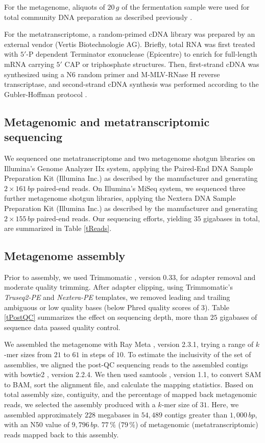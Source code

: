\documentclass{bmcart}
\begin{document}
For the metagenome, aliquots of $20\,g$ of the fermentation sample were used for total community DNA preparation as described previously \cite{Schlueter2008}.

For the metatranscriptome, a random-primed cDNA library was prepared by an external vendor (Vertis Biotechnologie AG). Briefly, total RNA was first treated with $5'$-P dependent Terminator exonuclease (Epicentre) to enrich for full-length mRNA carrying $5'$ CAP or triphosphate structures. Then, first-strand cDNA was synthesized using a N6 random primer and M-MLV-RNase H reverse transcriptase, and second-strand cDNA synthesis was performed according to the Gubler-Hoffman protocol \cite{GublerHoffman}.

\subsection*{Metagenomic and metatranscriptomic sequencing}
We sequenced one metatranscriptome and two metagenome shotgun libraries on Illumina's Genome Analyzer IIx system, applying the Paired-End DNA Sample Preparation Kit (Illumina Inc.) as described by the manufacturer and generating $2 \times 161\,bp$ paired-end reads.
On Illumina's MiSeq system, we sequenced three further metagenome shotgun libraries, applying the Nextera DNA Sample Preparation Kit (Illumina Inc.) as described by the manufacturer and generating $2 \times 155\,bp$ paired-end reads.
Our sequencing efforts, yielding $35$ gigabases in total, are summarized in Table \ref{tReads}.

\subsection*{Metagenome assembly}
Prior to assembly, we used Trimmomatic \cite{Trimmomatic}, version 0.33, for adapter removal and moderate quality trimming.
After adapter clipping, using Trimmomatic's \emph{Truseq2-PE} and \emph{Nextera-PE} templates, we removed leading and trailing ambiguous or low quality bases (below Phred quality scores of 3).
Table \ref{tPostQC} summarizes the effect on sequencing depth, more than $25$ gigabases of sequence data passed quality control.

We assembled the metagenome with Ray Meta \cite{RayMeta}, version 2.3.1, trying a range of $k$-mer sizes from $21$ to $61$ in steps of $10$.
To estimate the inclusivity of the set of assemblies, we aligned the post-QC sequencing reads to the assembled contigs with bowtie2 \cite{Bowtie2}, version 2.2.4.
We then used samtools \cite{Samtools}, version 1.1, to convert SAM to BAM, sort the alignment file, and calculate the mapping statistics.
Based on total assembly size, contiguity, and the percentage of mapped back metagenomic reads, we selected the assembly produced with a $k$-mer size of $31$.
Here, we assembled approximately $228$ megabases in $54,489$ contigs greater than $1,000\,bp$, with an N50 value of $9,796\,bp$. %
$77\,\%$ ($79\,\%$) of metagenomic (metatranscriptomic) reads mapped back to this assembly.
\end{document}
